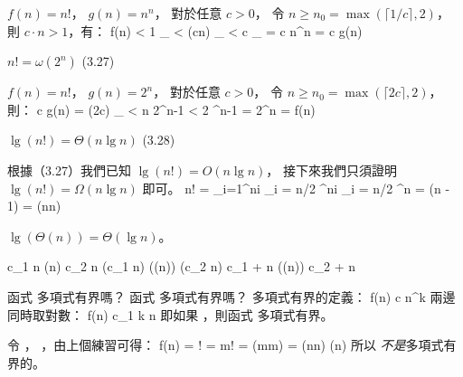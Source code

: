 \startANSWER
$f(n)=n!$， $g(n)=n^n$，
對於任意 $c>0$，
令 $n \ge n_0 = \max(\lceil 1/c\rceil, 2)$，
則 $c\cdot n > 1$，有：
\startformula\startmathalignment
{}\le f(n) \NC
< 1 \cdot {}_{} \NR
\NC \NC < (c\cdot n) \cdot {}_{} \NR
\NC \NC < c \cdot {}_{} \NR
\NC \NC = c n^n \NR
\NC \NC = c g(n) \NR
\stopmathalignment\stopformula
\stopANSWER

$n!=\omega(2^n)$ \hfill (3.27)

\startANSWER
$f(n)=n!$， $g(n)=2^n$，
對於任意 $c>0$，
令 $n \ge n_0 = \max(\lceil 2c \rceil, 2)$，
則：
\startformula\startmathalignment
{} \le c g(n) \NC
= (2c) \cdot {}_{} \NR
\NC \NC < n 2^{n-1} \NR
\NC \NC < 2 ^{n-1} \NR
\NC \NC = 2^n \NR
\NC \NC = f(n) \NR
\stopmathalignment\stopformula
\stopANSWER

$\lg(n!)=\Theta(n\lg n)$ \hfill (3.28)

\startANSWER
根據（3.27）我們已知 $\lg(n!)=O(n\lg n)$，
接下來我們只須證明 $\lg(n!)=\Omega(n\lg n)$ 即可。
\startformula\startmathalignment
\NC \lg n! \NC = \sum_{i=1}^{n}\lg i \NR
\NC \NC \ge \sum_{i = \lceil n/2 \rceil}^{n}\lg i \NR
\NC \NC \ge \sum_{i = \lceil n/2 \rceil}^{n} \lg {} \NR
\NC \NC \ge {}\lg {} \NR
\NC \NC = (\lg n - 1) \NR
\NC \NC = \Omega(n\lg n) \NR
\stopmathalignment\stopformula
\stopANSWER
\stopitem

\startitem
$\lg(\Theta(n)) = \Theta(\lg n)$。

\startANSWER
\startformula\startmathalignment[n=3,align={right,middle,left}]
\NC c_1 n \le \NC \Theta(n) \NC \le c_2 n \NR
\NC \lg(c_1 n) \le \NC \lg(\Theta(n)) \NC \le \lg(c_2 n) \NR
\NC \lg c_1 + \lg n \le \NC \lg(\Theta(n)) \NC \le \lg c_2 + \lg n \NR
\stopmathalignment\stopformula
\stopANSWER
\stopitem
\stopigBase
\stopEXERCISE

\startEXERCISE\DIFFICULT
函式  多項式有界嗎？
函式  多項式有界嗎？
\stopEXERCISE
\startANSWER
多項式有界的定義：
\startformula
 f(n) \leq c n^k
\stopformula
兩邊同時取對數：
\startformula
 \lg f(n) \leq c_1 k \lg n
\stopformula
即如果 ，則函式  多項式有界。

令 ， ，由上個練習可得：
\startformula\startalign
 \NC \lg f(n) \NC = \lg \lceil{}\rceil ! \NR
 \NC          \NC = \lg m! \NR
 \NC          \NC = \Theta(m\lg m) \NR
 \NC          \NC = \Theta(\lceil\lg n\rceil \lg \lceil \lg n\rceil) \NR
 \NC          \NC \neq \Theta(\lg n) \NR
\stopalign\stopformula
所以  \emph{不是}多項式有界的。

